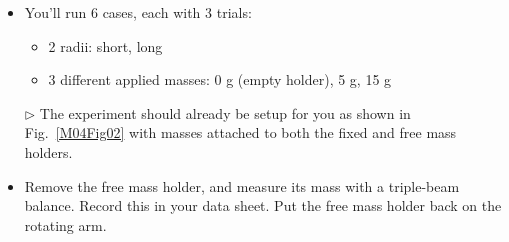 \begin{itemize}
\item You'll run 6 cases, each with 3 trials:
\begin{itemize}
    \item 2 radii: short, long
    \item 3 different applied masses: 0 g (empty holder), 5 g, 15 g
\end{itemize}

\item[$\triangleright$] The experiment should already be setup for you as shown in Fig.~\ref{M04Fig02} with masses attached to both the fixed and free mass holders. %

\item Remove the free mass holder, and measure its mass with a triple-beam balance. Record this in your data sheet. Put the free mass holder back on the rotating arm.


\end{itemize}
